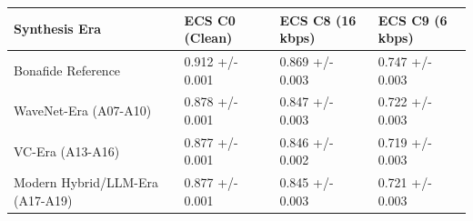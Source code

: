 \begin{tabular}{llll}
\toprule
Synthesis Era & ECS C0 (Clean) & ECS C8 (16 kbps) & ECS C9 (6 kbps) \\
\midrule
Bonafide Reference & 0.912 +/- 0.001 & 0.869 +/- 0.003 & 0.747 +/- 0.003 \\
WaveNet-Era (A07-A10) & 0.878 +/- 0.001 & 0.847 +/- 0.003 & 0.722 +/- 0.003 \\
VC-Era (A13-A16) & 0.877 +/- 0.001 & 0.846 +/- 0.002 & 0.719 +/- 0.003 \\
Modern Hybrid/LLM-Era (A17-A19) & 0.877 +/- 0.001 & 0.845 +/- 0.003 & 0.721 +/- 0.003 \\
\bottomrule
\end{tabular}
